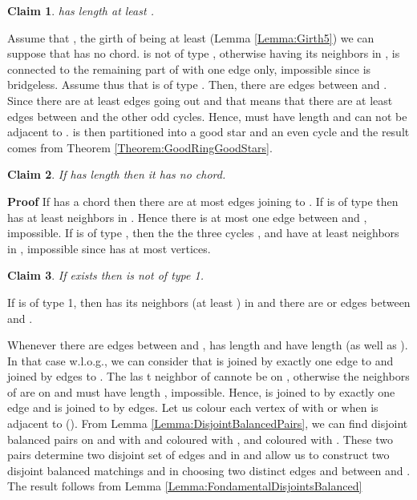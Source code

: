 \documentclass{elsart}
\theoremstyle{plain} \theoremheaderfont{\scshape}
\newtheorem{Clm}{Claim}[Thm]
\newenvironment{Prf}{{\bf \noindent Proof } }{\hfill\\}
\newenvironment{PrfClaim}{{\bf Proof }}{{\hfill\tiny{\\}}}
\begin{document}
\begin{Prf}
\begin{Clm} \label{Claim:Claim2_1_MinimumCounterExample32}
 has length at least .
\end{Clm}
\begin{PrfClaim}
Assume that , the girth of  being at least  (Lemma
\ref{Lemma:Girth5}) we can suppose that  has no chord.  is
not of type , otherwise  having its neighbors in ,
 is connected to the remaining part of  with one edge only,
impossible since  is bridgeless. Assume thus that  is of type
. Then, there are  edges between  and . Since there
are at least  edges going out  and  that means
that there are at least  edges between  and the other odd
cycles. Hence,  must have length  and can not be adjacent to
.  is then partitioned into a good star and an even cycle
and the result comes from Theorem \ref{Theorem:GoodRingGoodStars}.
\end{PrfClaim}

\begin{Clm} \label{Claim:Claim2_2_MinimumCounterExample32}
If  has length  then it has no chord.
\end{Clm}
\begin{PrfClaim} If  has a chord then there are at most 
edges joining  to . If  is of type  then  has at
least  neighbors in . Hence there is at most one edge
between  and , impossible. If  is of type , then the
the three cycles ,  and  have at least  neighbors
in , impossible since  has at most  vertices.
\end{PrfClaim}


\begin{Clm} \label{Claim:Claim3MinimumCounterExample32}
If  exists then  is not of type 1.
\end{Clm}
\begin{PrfClaim}
If  is of type 1, then  has its neighbors (at least ) in
 and there are  or  edges between  and .









Whenever there are  edges between  and ,  has length
 and  have length  (as well as ). In that
case w.l.o.g., we can consider that  is joined by exactly one
edge to  and joined by  edges to . The las t neighbor
of  cannote be on , otherwise the  neighbors of 
are on  and  must have length , impossible. Hence,
 is joined to  by exactly one edge and  is joined to
 by  edges. Let us colour each vertex  of  with
 or  when  is adjacent to  (). From Lemma
\ref{Lemma:DisjointBalancedPairs}, we can find  disjoint balanced
pairs on   and  with  and 
coloured with ,  and  coloured with . These two pairs
determine two disjoint set of edges  and  in
 and allow us to construct two disjoint balanced matchings
 and  in choosing two distinct edges 
and  between  and . The result follows from Lemma
\ref{Lemma:FondamentalDisjointsBalanced}





\end{PrfClaim}
\end{Prf}
\end{document}
